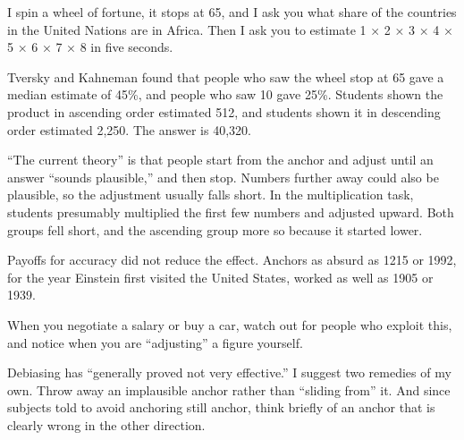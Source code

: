 
I spin a wheel of fortune, it stops at 65, and I ask you what share of the countries in the United Nations are in Africa. Then I ask you to estimate 1 × 2 × 3 × 4 × 5 × 6 × 7 × 8 in five seconds.

Tversky and Kahneman found that people who saw the wheel stop at 65 gave a median estimate of 45\%, and people who saw 10 gave 25\%.  Students shown the product in ascending order estimated 512, and students shown it in descending order estimated 2,250. The answer is 40,320.

``The current theory'' is that people start from the anchor and adjust until an answer ``sounds plausible,'' and then stop. Numbers further away could also be plausible, so the adjustment usually falls short. In the multiplication task, students presumably multiplied the first few numbers and adjusted upward. Both groups fell short, and the ascending group more so because it started lower. 

Payoffs for accuracy did not reduce the effect. Anchors as absurd as 1215 or 1992, for the year Einstein first visited the United States, worked as well as 1905 or 1939.

When you negotiate a salary or buy a car, watch out for people who exploit this, and notice when you are ``adjusting'' a figure yourself.

Debiasing has ``generally proved not very effective.'' I suggest two remedies of my own. Throw away an implausible anchor rather than ``sliding from'' it. And since subjects told to avoid anchoring still anchor, think briefly of an anchor that is clearly wrong in the other direction. 
